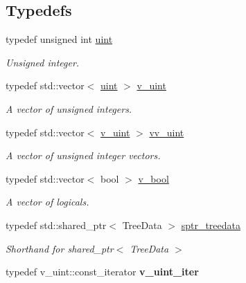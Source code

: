 \subsection*{Typedefs}
\begin{DoxyCompactItemize}
\item 
typedef unsigned int \hyperlink{namespacepruner_a659e6e64a9e2b8e981c3d34262a2f67e}{uint}\hypertarget{namespacepruner_a659e6e64a9e2b8e981c3d34262a2f67e}{}\label{namespacepruner_a659e6e64a9e2b8e981c3d34262a2f67e}

\begin{DoxyCompactList}\small\item\em Unsigned integer. \end{DoxyCompactList}\item 
typedef std\+::vector$<$ \hyperlink{namespacepruner_a659e6e64a9e2b8e981c3d34262a2f67e}{uint} $>$ \hyperlink{namespacepruner_af0145646bd7ede012cd336b416bc5579}{v\+\_\+uint}\hypertarget{namespacepruner_af0145646bd7ede012cd336b416bc5579}{}\label{namespacepruner_af0145646bd7ede012cd336b416bc5579}

\begin{DoxyCompactList}\small\item\em A vector of unsigned integers. \end{DoxyCompactList}\item 
typedef std\+::vector$<$ \hyperlink{namespacepruner_af0145646bd7ede012cd336b416bc5579}{v\+\_\+uint} $>$ \hyperlink{namespacepruner_acc0badaa0c5a170f5f93cfc20ec428a2}{vv\+\_\+uint}\hypertarget{namespacepruner_acc0badaa0c5a170f5f93cfc20ec428a2}{}\label{namespacepruner_acc0badaa0c5a170f5f93cfc20ec428a2}

\begin{DoxyCompactList}\small\item\em A vector of unsigned integer vectors. \end{DoxyCompactList}\item 
typedef std\+::vector$<$ bool $>$ \hyperlink{namespacepruner_a7f5576bfe937fd464f6f67ed49997da3}{v\+\_\+bool}\hypertarget{namespacepruner_a7f5576bfe937fd464f6f67ed49997da3}{}\label{namespacepruner_a7f5576bfe937fd464f6f67ed49997da3}

\begin{DoxyCompactList}\small\item\em A vector of logicals. \end{DoxyCompactList}\item 
typedef std\+::shared\+\_\+ptr$<$ Tree\+Data $>$ \hyperlink{namespacepruner_a533476fef17527e75c4fba71d8c4ce50}{sptr\+\_\+treedata}\hypertarget{namespacepruner_a533476fef17527e75c4fba71d8c4ce50}{}\label{namespacepruner_a533476fef17527e75c4fba71d8c4ce50}

\begin{DoxyCompactList}\small\item\em Shorthand for shared\+\_\+ptr$<$ Tree\+Data $>$ \end{DoxyCompactList}\item 
typedef v\+\_\+uint\+::const\+\_\+iterator {\bfseries v\+\_\+uint\+\_\+iter}\hypertarget{namespacepruner_adb695993f778a41bcfc1eed151f9c0bd}{}\label{namespacepruner_adb695993f778a41bcfc1eed151f9c0bd}

\end{DoxyCompactItemize}
